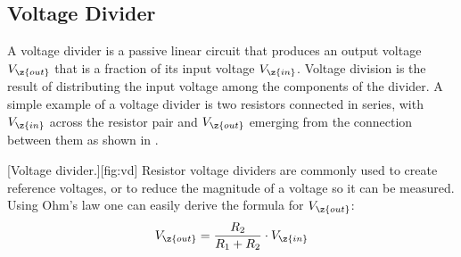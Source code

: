\subsection{Voltage Divider}\label{sec:vd}
A voltage divider is a passive linear circuit that produces an output voltage $V_{\z{out}}$ that is a fraction of its input voltage $V_{\z{in}}$. Voltage division is the result of distributing the input voltage among the components of the divider. A simple example of a voltage divider is two resistors connected in series, with $V_{\z{in}}$ across the resistor pair and $V_{\z{out}}$ emerging from the connection between them as shown in .\par
%
[Voltage divider.][fig:vd]
%
Resistor voltage dividers are commonly used to create reference voltages, or to reduce the magnitude of a voltage so it can be measured. Using Ohm's law one can easily derive the formula for $V_{\z{out}}$:
%
\begin{equation}\label{eq:vd}
	V_{\z{out}} = \dfrac{R_{2}}{R_{1} + R_{2}}\cdot V_{\z{in}}
\end{equation}
%
